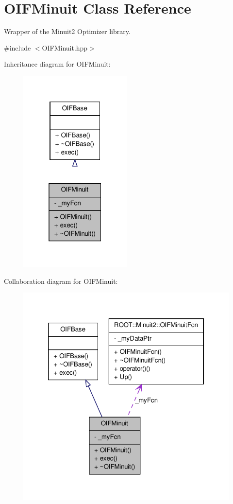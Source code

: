 \hypertarget{classOIFMinuit}{
\section{OIFMinuit Class Reference}
\label{d5/db7/classOIFMinuit}
}


Wrapper of the Minuit2 Optimizer library.  




{\ttfamily \#include $<$OIFMinuit.hpp$>$}



Inheritance diagram for OIFMinuit:
\nopagebreak
\begin{figure}[H]
\begin{center}
\leavevmode
\includegraphics[width=160pt]{dc/daa/classOIFMinuit__inherit__graph}
\end{center}
\end{figure}


Collaboration diagram for OIFMinuit:
\nopagebreak
\begin{figure}[H]
\begin{center}
\leavevmode
\includegraphics[width=322pt]{d4/da7/classOIFMinuit__coll__graph}
\end{center}
\end{figure}
